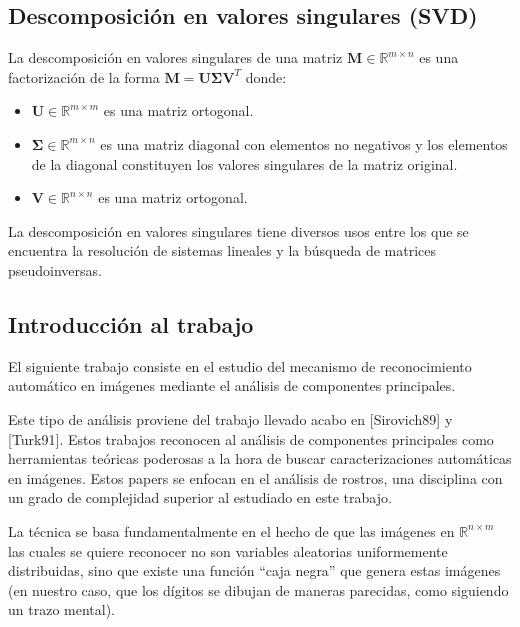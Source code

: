 \subsection{Descomposici\'on en valores singulares (SVD)}

La descomposici\'on en valores singulares de una matriz $\mathbf{M} \in \mathbb{R}^{m \times n}$ es una factorizaci\'on de la forma $\mathbf{M} =
\mathbf{U} \boldsymbol{\Sigma} \mathbf{V}^T$ donde:

\begin{itemize}
  \item $\mathbf{U} \in \mathbb{R}^{m \times m}$ es una matriz ortogonal.
  \item $\boldsymbol{\Sigma} \in \mathbb{R}^{m \times n}$ es una matriz diagonal con elementos no negativos y los elementos de la
diagonal constituyen los valores singulares de la matriz original.
  \item $\mathbf{V} \in \mathbb{R}^{n \times n}$ es una matriz ortogonal.
\end{itemize}

La descomposici\'on en valores singulares tiene diversos usos entre los que se encuentra la resoluci\'on de
sistemas lineales y la b\'usqueda de matrices pseudoinversas.

\subsection{Introducci\'on al trabajo}

El siguiente trabajo consiste en el estudio del mecanismo de reconocimiento autom\'atico
en im\'agenes mediante el an\'alisis de componentes principales.

Este tipo de an\'alisis proviene del trabajo llevado acabo en [Sirovich89] y [Turk91]. Estos
trabajos reconocen al an\'alisis de componentes principales como herramientas te\'oricas poderosas
a la hora de buscar caracterizaciones autom\'aticas en im\'agenes. Estos papers se enfocan en el
an\'alisis de rostros, una disciplina con un grado de complejidad superior al estudiado en este
trabajo.

La t\'ecnica se basa fundamentalmente en el hecho de que las im\'agenes en $\mathbb{R}^{n \times m}$ las cuales se
quiere reconocer no son variables aleatorias uniformemente distribuidas, sino
que existe una funci\'on ``caja negra'' que genera estas im\'agenes (en nuestro 
caso, que los d\'igitos se dibujan de maneras parecidas, como siguiendo un trazo mental).

